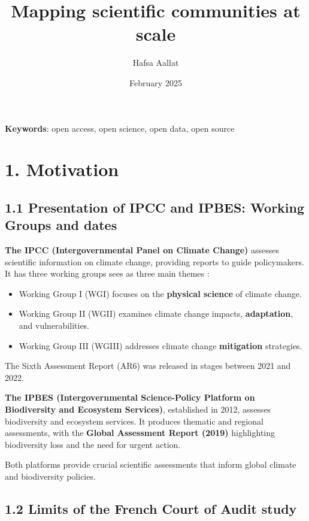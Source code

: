 \documentclass[
]{article}
\title{Mapping scientific communities at scale}
\author[%
  1%
  ]{%
  Hafsa Aallat%
}
\affil[1]{French Ministry of Higher Education and Research, Paris,
France}
\date{February 2025}
\providecommand{\tightlist}{%
  \setlength{\itemsep}{0pt}\setlength{\parskip}{0pt}}
\begin{document}
\maketitle

\textbf{Keywords}: open access, open science, open data, open source

\hypertarget{motivation}{%
\section{1. Motivation}\label{motivation}}

\hypertarget{presentation-of-ipcc-and-ipbes-working-groups-and-dates}{%
\subsection{1.1 Presentation of IPCC and IPBES: Working Groups and
dates}\label{presentation-of-ipcc-and-ipbes-working-groups-and-dates}}

\textbf{The IPCC (Intergovernmental Panel on Climate Change)} assesses
scientific information on climate change, providing reports to guide
policymakers. It has three working groups sees as three main themes :

\begin{itemize}
\tightlist
\item
  Working Group I (WGI) focuses on the \textbf{physical science} of
  climate change.
\item
  Working Group II (WGII) examines climate change impacts,
  \textbf{adaptation}, and vulnerabilities.
\item
  Working Group III (WGIII) addresses climate change \textbf{mitigation}
  strategies.
\end{itemize}

The Sixth Assessment Report (AR6) was released in stages between 2021
and 2022.

\textbf{The IPBES (Intergovernmental Science-Policy Platform on
Biodiversity and Ecosystem Services)}, established in 2012, assesses
biodiversity and ecosystem services. It produces thematic and regional
assessments, with the \textbf{Global Assessment Report (2019)}
highlighting biodiversity loss and the need for urgent action.

Both platforms provide crucial scientific assessments that inform global
climate and biodiversity policies.

\hypertarget{limits-of-the-french-court-of-audit-study}{%
\subsection{1.2 Limits of the French Court of Audit
study}\label{limits-of-the-french-court-of-audit-study}}
\end{document}
